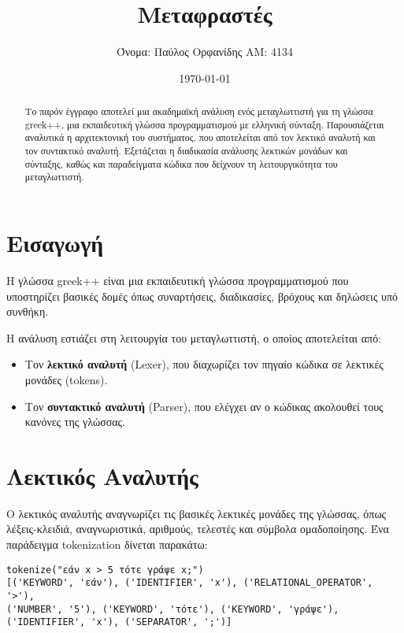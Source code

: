 \documentclass[12pt,a4paper]{article}
\title{\textbf{Μεταφραστές}}
\author{Όνομα: Παύλος Ορφανίδης ΑΜ: 4134}
\date{\today}
\begin{document}
\maketitle


\begin{abstract}
Το παρόν έγγραφο αποτελεί μια ακαδημαϊκή ανάλυση ενός μεταγλωττιστή για τη γλώσσα greek++, μια εκπαιδευτική γλώσσα προγραμματισμού με ελληνική σύνταξη. Παρουσιάζεται αναλυτικά η αρχιτεκτονική του συστήματος, που αποτελείται από τον λεκτικό αναλυτή και τον συντακτικό αναλυτή. Εξετάζεται η διαδικασία ανάλυσης λεκτικών μονάδων και σύνταξης, καθώς και παραδείγματα κώδικα που δείχνουν τη λειτουργικότητα του μεταγλωττιστή.
\end{abstract}


\tableofcontents
\newpage


\section{Εισαγωγή}
Η γλώσσα greek++ είναι μια εκπαιδευτική γλώσσα προγραμματισμού που υποστηρίζει βασικές δομές όπως συναρτήσεις, διαδικασίες, βρόχους και δηλώσεις υπό συνθήκη.


Η ανάλυση εστιάζει στη λειτουργία του μεταγλωττιστή, ο οποίος αποτελείται από:
\begin{itemize}
\item Τον \textbf{λεκτικό αναλυτή} (Lexer), που διαχωρίζει τον πηγαίο κώδικα σε λεκτικές μονάδες (tokens).
\item Τον \textbf{συντακτικό αναλυτή} (Parser), που ελέγχει αν ο κώδικας ακολουθεί τους κανόνες της γλώσσας.
\end{itemize}


\section{Λεκτικός Αναλυτής}
Ο λεκτικός αναλυτής αναγνωρίζει τις βασικές λεκτικές μονάδες της γλώσσας, όπως λέξεις-κλειδιά, αναγνωριστικά, αριθμούς, τελεστές και σύμβολα ομαδοποίησης. Ένα παράδειγμα tokenization δίνεται παρακάτω:


\begin{Verbatim}[frame=single, fontsize=\small]
tokenize("εάν x > 5 τότε γράψε x;")
[('KEYWORD', 'εάν'), ('IDENTIFIER', 'x'), ('RELATIONAL_OPERATOR', '>'),
('NUMBER', '5'), ('KEYWORD', 'τότε'), ('KEYWORD', 'γράψε'),
('IDENTIFIER', 'x'), ('SEPARATOR', ';')]
\end{Verbatim}
\end{document}

